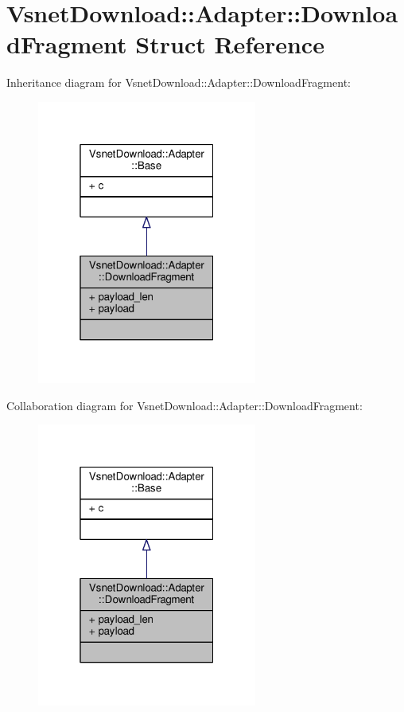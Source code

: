 \hypertarget{structVsnetDownload_1_1Adapter_1_1DownloadFragment}{}\section{Vsnet\+Download\+:\+:Adapter\+:\+:Download\+Fragment Struct Reference}
\label{structVsnetDownload_1_1Adapter_1_1DownloadFragment}


Inheritance diagram for Vsnet\+Download\+:\+:Adapter\+:\+:Download\+Fragment\+:
\nopagebreak
\begin{figure}[H]
\begin{center}
\leavevmode
\includegraphics[width=205pt]{d5/d75/structVsnetDownload_1_1Adapter_1_1DownloadFragment__inherit__graph}
\end{center}
\end{figure}


Collaboration diagram for Vsnet\+Download\+:\+:Adapter\+:\+:Download\+Fragment\+:
\nopagebreak
\begin{figure}[H]
\begin{center}
\leavevmode
\includegraphics[width=205pt]{d4/d21/structVsnetDownload_1_1Adapter_1_1DownloadFragment__coll__graph}
\end{center}
\end{figure}
